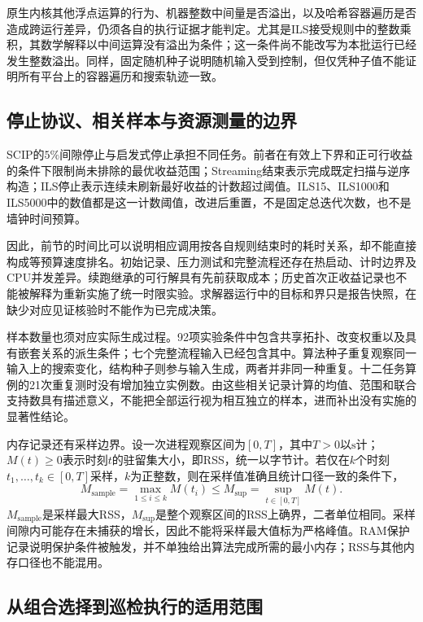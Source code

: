 原生内核其他浮点运算的行为、机器整数中间量是否溢出，以及哈希容器遍历是否造成跨运行差异，仍须各自的执行证据才能判定。尤其是ILS接受规则中的整数乘积，其数学解释以中间运算没有溢出为条件；这一条件尚不能改写为本批运行已经发生整数溢出。同样，固定随机种子说明随机输入受到控制，但仅凭种子值不能证明所有平台上的容器遍历和搜索轨迹一致。

\subsection{停止协议、相关样本与资源测量的边界}

SCIP的$5\%$间隙停止与启发式停止承担不同任务。前者在有效上下界和正可行收益的条件下限制尚未排除的最优收益范围；Streaming结束表示完成既定扫描与逆序构造；ILS停止表示连续未刷新最好收益的计数超过阈值。ILS15、ILS1000和ILS5000中的数值都是这一计数阈值，改进后重置，不是固定总迭代次数，也不是墙钟时间预算。

因此，前节的时间比可以说明相应调用按各自规则结束时的耗时关系，却不能直接构成等预算速度排名。初始记录、压力测试和完整流程还存在热启动、计时边界及CPU并发差异。续跑继承的可行解具有先前获取成本；历史首次正收益记录也不能被解释为重新实施了统一时限实验。求解器运行中的目标和界只是报告快照，在缺少对应见证核验时不能作为已完成决策。

样本数量也须对应实际生成过程。92项实验条件中包含共享拓扑、改变权重以及具有嵌套关系的派生条件；七个完整流程输入已经包含其中。算法种子重复观察同一输入上的搜索变化，结构种子则参与输入生成，两者并非同一种重复。十二任务算例的21次重复测时没有增加独立实例数。由这些相关记录计算的均值、范围和联合支持数具有描述意义，不能把全部运行视为相互独立的样本，进而补出没有实施的显著性结论。

内存记录还有采样边界。设一次进程观察区间为$[0,T]$，其中$T>0$以$\mathrm{s}$计；$M(t)\geq0$表示时刻$t$的驻留集大小，即RSS，统一以字节计。若仅在$k$个时刻$t_1,\ldots,t_k\in[0,T]$采样，$k$为正整数，则在采样值准确且统计口径一致的条件下，
\begin{equation}
 M_{\mathrm{sample}}=\max_{1\leq i\leq k}M(t_i)
 \leq
 M_{\mathrm{sup}}=\sup_{t\in[0,T]}M(t).
 \label{s0308:memory_sampling}
\end{equation}
$M_{\mathrm{sample}}$是采样最大RSS，$M_{\mathrm{sup}}$是整个观察区间的RSS上确界，二者单位相同。采样间隙内可能存在未捕获的增长，因此不能将采样最大值标为严格峰值。RAM保护记录说明保护条件被触发，并不单独给出算法完成所需的最小内存；RSS与其他内存口径也不能混用。

\subsection{从组合选择到巡检执行的适用范围}

